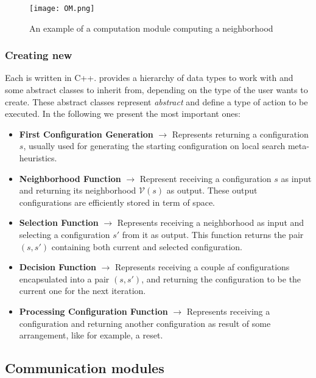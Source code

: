 \begin{figure}
	\centering	
	\texttt{[image: OM.png]}
	\caption{An example of a computation module computing a neighborhood}\label{fig:om}
\end{figure}

\subsubsection{Creating new \oms}
\label{subsubsec:creatingoms}

Each \om{} is written in C++. \posl{} provides a hierarchy of data types to work with %
and some abstract classes to inherit from, depending on the type of \om{} the user wants to create. These abstract classes represent {\it abstract} \oms{} and define a type of action to be executed. In the following we present the most important ones:

\begin{itemize}
\item \textbf{First Configuration Generation} $\rightarrow$ Represents \oms{} returning a configuration $s$, usually used for generating the starting configuration on local search meta-heuristics. 
\item \textbf{Neighborhood Function} $\rightarrow$ Represent \oms{} receiving a configuration $s$ as input and returning its neighborhood $\mathcal{V}(s)$ as output. These output configurations are efficiently stored in term of space.
\item \textbf{Selection Function} $\rightarrow$ Represents \oms{} receiving a neighborhood as input and selecting a configuration $s'$ from it as output. This function returns the pair $(s, s')$ containing both current and selected configuration.
\item \textbf{Decision Function} $\rightarrow$ Represents \oms{} receiving a couple af configurations encapsulated into a pair $(s, s')$, and returning the configuration to be the current one for the next iteration. 
\item \textbf{Processing Configuration Function} $\rightarrow$ Represents \oms{} receiving a configuration and returning another configuration as result of some arrangement, like for example, a reset. 
\end{itemize}

\subsection{Communication modules}

